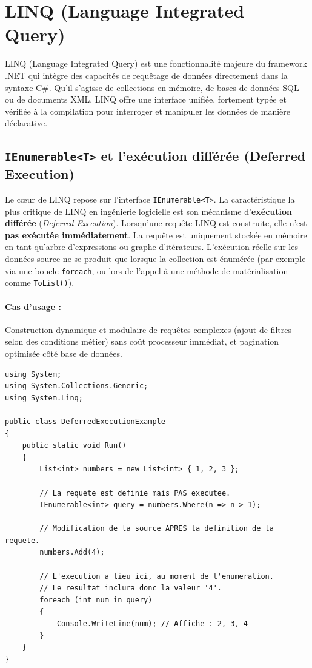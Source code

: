 \section{LINQ (Language Integrated Query)}

LINQ (Language Integrated Query) est une fonctionnalité majeure du framework .NET qui intègre des capacités de requêtage de données directement dans la syntaxe C\#. Qu'il s'agisse de collections en mémoire, de bases de données SQL ou de documents XML, LINQ offre une interface unifiée, fortement typée et vérifiée à la compilation pour interroger et manipuler les données de manière déclarative.

\subsection{\texttt{IEnumerable<T>} et l'exécution différée (Deferred Execution)}

Le cœur de LINQ repose sur l'interface \texttt{IEnumerable<T>}. La caractéristique la plus critique de LINQ en ingénierie logicielle est son mécanisme d'\textbf{exécution différée} (\textit{Deferred Execution}). 
Lorsqu'une requête LINQ est construite, elle n'est \textbf{pas exécutée immédiatement}. La requête est uniquement stockée en mémoire en tant qu'arbre d'expressions ou graphe d'itérateurs. L'exécution réelle sur les données source ne se produit que lorsque la collection est énumérée (par exemple via une boucle \texttt{foreach}, ou lors de l'appel à une méthode de matérialisation comme \texttt{ToList()}).

\paragraph{Cas d'usage :} Construction dynamique et modulaire de requêtes complexes (ajout de filtres selon des conditions métier) sans coût processeur immédiat, et pagination optimisée côté base de données.

\begin{lstlisting}[language={[Sharp]C}]
using System;
using System.Collections.Generic;
using System.Linq;

public class DeferredExecutionExample
{
    public static void Run()
    {
        List<int> numbers = new List<int> { 1, 2, 3 };
        
        // La requete est definie mais PAS executee.
        IEnumerable<int> query = numbers.Where(n => n > 1);
        
        // Modification de la source APRES la definition de la requete.
        numbers.Add(4);
        
        // L'execution a lieu ici, au moment de l'enumeration. 
        // Le resultat inclura donc la valeur '4'.
        foreach (int num in query)
        {
            Console.WriteLine(num); // Affiche : 2, 3, 4
        }
    }
}
\end{lstlisting}

